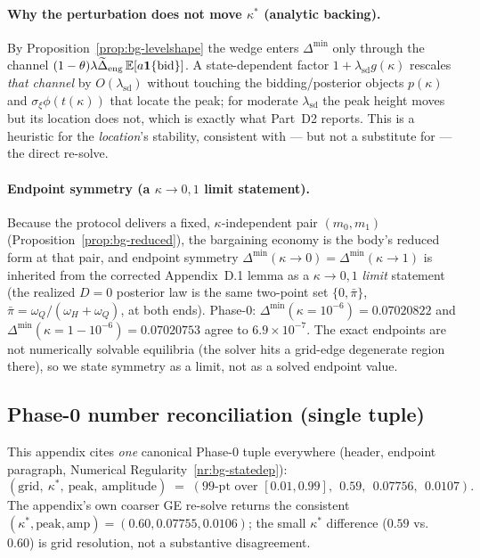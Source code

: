 \paragraph{Why the perturbation does not move $\kappa^{\ast}$ (analytic backing).}
By Proposition~\ref{prop:bg-levelshape} the wedge enters $\Delta^{\min}$ only
through the channel $(1-\theta)\lambda\widetilde{\Delta}_{\mathrm{eng}}\,\mathbb{E}[a\mathbf{1}\{\mathrm{bid}\}]$.
A state-dependent factor $1+\lambda_{\mathrm{sd}}g(\kappa)$ rescales \emph{that
channel} by $O(\lambda_{\mathrm{sd}})$ without touching the bidding/posterior
objects $p(\kappa)$ and $\sigma_\xi\phi(t(\kappa))$ that locate the peak; for
moderate $\lambda_{\mathrm{sd}}$ the peak height moves but its location does not,
which is exactly what Part~D2 reports. This is a heuristic for the
\emph{location}'s stability, consistent with --- but not a substitute for --- the
direct re-solve.

\paragraph{Endpoint symmetry (a $\kappa\to0,1$ limit statement).}
Because the protocol delivers a fixed, $\kappa$-independent pair $(m_{0},m_{1})$
(Proposition~\ref{prop:bg-reduced}), the bargaining economy is the body's reduced
form at that pair, and endpoint symmetry
$\Delta^{\min}(\kappa\!\to\!0)=\Delta^{\min}(\kappa\!\to\!1)$ is inherited from
the corrected Appendix~D.1 lemma as a $\kappa\to0,1$ \emph{limit} statement (the
realized $D=0$ posterior law is the same two-point set $\{0,\bar\pi\}$,
$\bar\pi=\omega_{Q}/(\omega_{H}+\omega_{Q})$, at both ends). Phase-0:
$\Delta^{\min}(\kappa=10^{-6})=0.07020822$ and
$\Delta^{\min}(\kappa=1-10^{-6})=0.07020753$ agree to $6.9\times10^{-7}$. The
exact endpoints are not numerically solvable equilibria (the solver hits a
grid-edge degenerate region there), so we state symmetry as a limit, not as a
solved endpoint value.

\subsection*{Phase-0 number reconciliation (single tuple)}
\label{app:bg-numrecon}

This appendix cites \emph{one} canonical Phase-0 tuple everywhere (header,
endpoint paragraph, Numerical Regularity~\ref{nr:bg-statedep}):
\[
  (\text{grid},\ \kappa^{\ast},\ \text{peak},\ \text{amplitude})
  \;=\;
  (\text{99-pt over }[0.01,0.99],\ \ 0.59,\ \ 0.07756,\ \ 0.0107).
\]
The appendix's own coarser GE re-solve returns the consistent
$(\kappa^{\ast},\text{peak},\text{amp})=(0.60,0.07755,0.0106)$; the small
$\kappa^{\ast}$ difference ($0.59$ vs.\ $0.60$) is grid resolution, not a
substantive disagreement.

